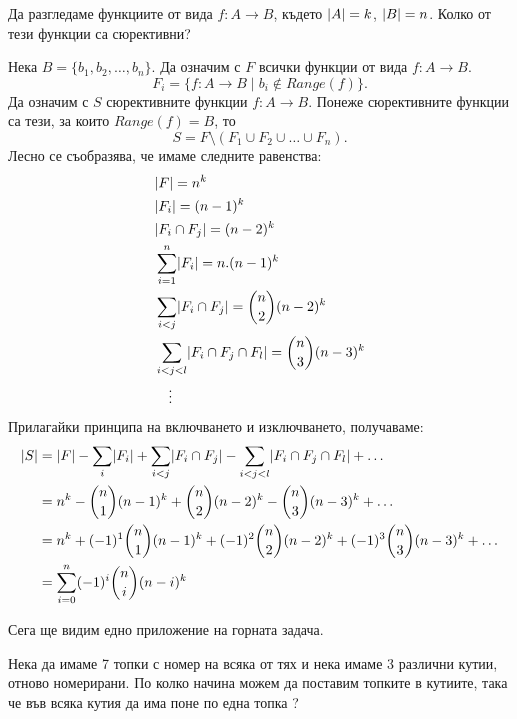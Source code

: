 \begin{problem}
  Да разгледаме функциите от вида $f:A\to B$, където $\lvert{A}\rvert = k$, $\lvert{B}\rvert = n$.
  Колко от тези функции са сюрективни?
\end{problem}
\begin{solution}
  Нека $B = \{b_1,b_2,\dots,b_n\}$.
  Да означим с $F$ всички функции от вида $f:A\to B$.
  \[F_i = \{f:A\to B\mid b_i \not\in Range(f)\}.\]
  Да означим с $S$ сюрективните функции $f:A\to B$.
  Понеже сюрективните функции са тези, за които $Range(f) = B$, то
  \[S = F\setminus(F_1\cup F_2 \cup \dots \cup F_n).\]
  Лесно се съобразява, че имаме следните равенства:
  \begin{align*}
    & \lvert{F}\rvert = n^k\\
    & \lvert{F_i}\rvert = (n-1)^k\\
    & \lvert{F_i \cap F_j}\rvert = (n-2)^k\\
    & \sum^n_{i=1}\lvert{F_i}\rvert = n.(n-1)^k\\
    & \sum_{i < j}\lvert{F_i \cap F_j}\rvert = \binom{n}{2}(n-2)^k\\
    & \sum_{i < j < l}\lvert{F_i \cap F_j \cap F_l}\rvert = \binom{n}{3}(n-3)^k\\
    & \quad \vdots
  \end{align*}
  Прилагайки принципа на включването и изключването, получаваме:
  \begin{align*}
    \lvert{S}\rvert & = \lvert{F}\rvert - \sum_i \lvert{F_i}\rvert + \sum_{i < j}\lvert{F_i\cap F_j}\rvert - \sum_{i < j < l}\lvert{F_i \cap F_j \cap F_l}\rvert + \dots \\
    & = n^k - \binom{n}{1}(n-1)^k + \binom{n}{2}(n-2)^k - \binom{n}{3}(n-3)^k + \dots\\
    & = n^k + (-1)^1\binom{n}{1}(n-1)^k + (-1)^2\binom{n}{2}(n-2)^k + (-1)^3\binom{n}{3}(n-3)^k + \dots\\
    & = \sum^n_{i=0}(-1)^i\binom{n}{i}(n-i)^k
  \end{align*}
\end{solution}

Сега ще видим едно приложение на горната задача.

\begin{problem}
  Нека да имаме 7 топки с номер на всяка от тях и нека имаме 3 различни кутии, отново номерирани.
  По колко начина можем да поставим топките в кутиите, така че във всяка кутия да има поне по една топка ?
\end{problem}


